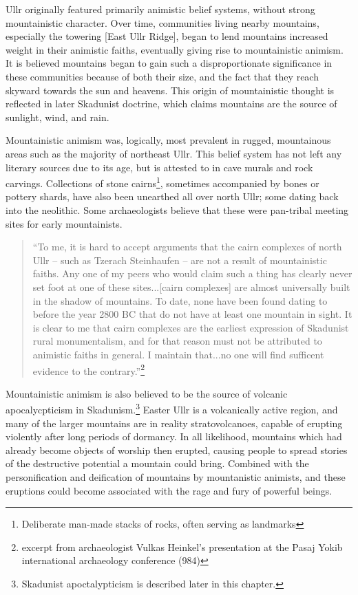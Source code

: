 Ullr originally featured primarily animistic belief systems, without strong mountainistic character. Over time, communities living nearby mountains, especially the towering [East Ullr Ridge], began to lend mountains increased weight in their animistic faiths, eventually giving rise to mountainistic animism. It is believed mountains began to gain such a disproportionate significance in these communities because of both their size, and the fact that they reach skyward towards the sun and heavens. This origin of mountainistic thought is reflected in later Skadunist doctrine, which claims mountains are the source of sunlight, wind, and rain.\par

Mountainistic animism was, logically, most prevalent in rugged, mountainous areas such as the majority of northeast Ullr. This belief system has not left any literary sources due to its age, but is attested to in cave murals and rock carvings. Collections of stone cairns\footnote{Deliberate man-made stacks of rocks, often serving as landmarks}, sometimes accompanied by bones or pottery shards, have also been unearthed all over north Ullr; some dating back into the neolithic. Some archaeologists believe that these were pan-tribal meeting sites for early mountainists. \par
\begin{quote}
``To me, it is hard to accept arguments that the cairn complexes of north Ullr -- such as Tzerach Steinhaufen -- are not a result of mountainistic faiths. Any one of my peers who would claim such a thing has clearly never set foot at one of these sites...[cairn complexes] are almost universally built in the shadow of mountains. To date, none have been found dating to before the year 2800 BC that do not have at least one mountain in sight. It is clear to me that cairn complexes are the earliest expression of Skadunist rural monumentalism, and for that reason must not be attributed to animistic faiths in general. I maintain that...no one will find sufficent evidence to the contrary.''\footnote{excerpt from archaeologist Vulkas Heinkel's presentation at the Pasaj Yokib international archaeology conference (984)}
\end{quote}

Mountainistic animism is also believed to be the source of volcanic apocalycpticism in Skadunism.\footnote{Skadunist apoctalypticism is described later in this chapter.} Easter Ullr is a volcanically active region, and many of the larger mountains are in reality stratovolcanoes, capable of erupting violently after long periods of dormancy. In all likelihood, mountains which had already become objects of worship then erupted, causing people to spread stories of the  destructive potential a mountain could bring. Combined with the personification and deification of mountains by mountanistic animists, and these eruptions could become associated with the rage and fury of powerful beings.

